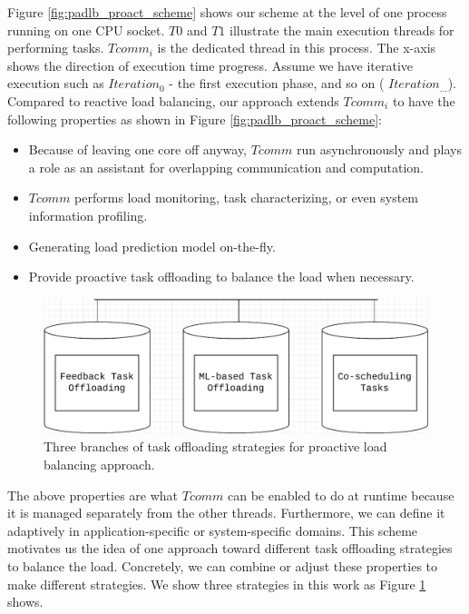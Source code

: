 Figure \ref{fig:padlb_proact_scheme} shows our scheme at the level of one process running on one CPU socket. $T0$ and $T1$ illustrate the main execution threads for performing tasks. $Tcomm_{i}$ is the dedicated thread in this process. The x-axis shows the direction of execution time progress. Assume we have iterative execution such as $Iteration_{0}$ - the first execution phase, and so on ( $Iteration_{...}$). Compared to reactive load balancing, our approach extends $Tcomm_{i}$ to have the following properties as shown in Figure \ref{fig:padlb_proact_scheme}:

\begin{itemize}
	\item Because of leaving one core off anyway, $Tcomm$ run asynchronously and plays a role as an assistant for overlapping communication and computation.
	\item $Tcomm$ performs load monitoring, task characterizing, or even system information profiling.
	\item Generating load prediction model on-the-fly.
	\item Provide proactive task offloading to balance the load when necessary.
\end{itemize}

\begin{figure}[t]
  \centering
  \includegraphics[scale=0.625]{./pictures/padlb_approach/padlb_three_branches_proact_strategies.pdf}
	\caption{Three branches of task offloading strategies for proactive load balancing approach.}
	\label{fig:three_branches_proact_strategies}
\end{figure}

The above properties are what $Tcomm$ can be enabled to do at runtime because it is managed separately from the other threads. Furthermore, we can define it adaptively in application-specific or system-specific domains. This scheme motivates us the idea of one approach toward different task offloading strategies to balance the load. Concretely, we can combine or adjust these properties to make different strategies. We show three strategies in this work as Figure \ref{fig:three_branches_proact_strategies} shows.\\


